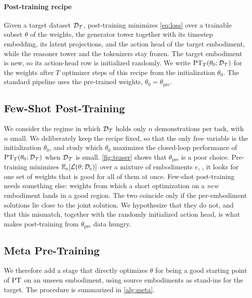 \paragraph{Post-training recipe}
Given a target dataset $\mathcal{D}_{\mathcal{T}}$, post-training minimizes \cref{eq:loss} over a trainable subset $\theta$ of the weights, the generator tower together with its timestep embedding, its latent projections, and the action head of the target embodiment, while the reasoner tower and the tokenizers stay frozen.
The target embodiment is new, so its action-head row is initialized randomly.
We write $\mathrm{PT}_T(\theta_0;\mathcal{D}_{\mathcal{T}})$ for the weights after $T$ optimizer steps of this recipe from the initialization $\theta_0$.
The standard pipeline uses the pre-trained weights, $\theta_0=\theta_{\mathrm{pre}}$.

\subsection{Few-Shot Post-Training}
\label{sec:problem}

We consider the regime in which $\mathcal{D}_{\mathcal{T}}$ holds only $n$ demonstrations per task, with $n$ small.
We deliberately keep the recipe fixed, so that the only free variable is the initialization $\theta_0$, and study which $\theta_0$ maximizes the closed-loop performance of $\mathrm{PT}_T(\theta_0;\mathcal{D}_{\mathcal{T}})$ when $\mathcal{D}_{\mathcal{T}}$ is small.
\cref{fig:teaser} shows that $\theta_{\mathrm{pre}}$ is a poor choice.
Pre-training minimizes $\mathbb{E}_{e}[\mathcal{L}(\theta;\mathcal{D}_e)]$ over a mixture of embodiments $e$, \ie, it looks for one set of weights that is good for all of them at once.
Few-shot post-training needs something else: weights from which a short optimization on a \emph{new} embodiment lands in a good region.
The two coincide only if the per-embodiment solutions lie close to the joint solution.
We hypothesize that they do not, and that this mismatch, together with the randomly initialized action head, is what makes post-training from $\theta_{\mathrm{pre}}$ data hungry.

\subsection{Meta Pre-Training}
\label{sec:meta}

We therefore add a stage that directly optimizes $\theta$ for being a good starting point of $\mathrm{PT}$ on an unseen embodiment, using source embodiments as stand-ins for the target.
The procedure is summarized in \cref{alg:meta}.

